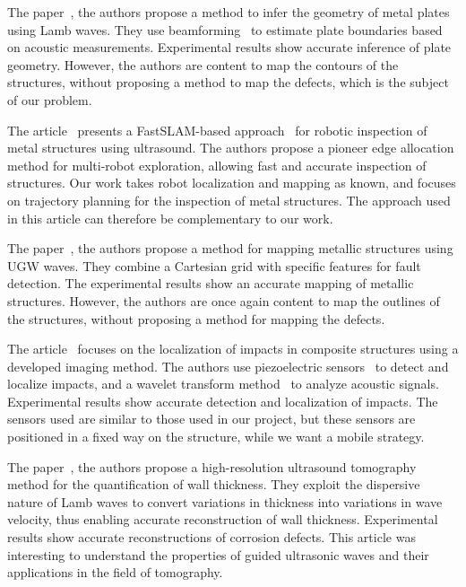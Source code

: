 \documentclass[english,RandD]{rapportPFE}  %
\begin{document}
		The paper~\cite{OUABI2022106705}, the authors propose a method to infer the geometry of metal plates using Lamb waves.
		They use beamforming~\cite{enwiki:1151960654} to estimate plate boundaries based on acoustic measurements.
		Experimental results show accurate inference of plate geometry.
		However, the authors are content to map the contours of the structures, without proposing a method to map the defects, which is the subject of our problem.

		The article~\cite{9364359} presents a FastSLAM-based approach~\cite{article254524} for robotic inspection of metal structures using ultrasound.
		The authors propose a pioneer edge allocation method for multi-robot exploration, allowing fast and accurate inspection of structures.
		Our work takes robot localization and mapping as known, and focuses on trajectory planning for the inspection of metal structures.
		The approach used in this article can therefore be complementary to our work.

		The paper~\cite{9811581}, the authors propose a method for mapping metallic structures using UGW waves.
		They combine a Cartesian grid with specific features for fault detection.
		The experimental results show an accurate mapping of metallic structures.
		However, the authors are once again content to map the outlines of the structures, without proposing a method for mapping the defects.

		The article~\cite{inventions3030059} focuses on the localization of impacts in composite structures using a developed imaging method.
		The authors use piezoelectric sensors~\cite{enwiki:1154129092} to detect and localize impacts, and a wavelet transform method~\cite{enwiki:1147185762} to analyze acoustic signals.
		Experimental results show accurate detection and localization of impacts.
		The sensors used are similar to those used in our project, but these sensors are positioned in a fixed way on the structure, while we want a mobile strategy.

		The paper~\cite{HUTHWAITE2013979}, the authors propose a high-resolution ultrasound tomography method for the quantification of wall thickness.
		They exploit the dispersive nature of Lamb waves to convert variations in thickness into variations in wave velocity, thus enabling accurate reconstruction of wall thickness.
		Experimental results show accurate reconstructions of corrosion defects.
		This article was interesting to understand the properties of guided ultrasonic waves and their applications in the field of tomography.
\end{document}
